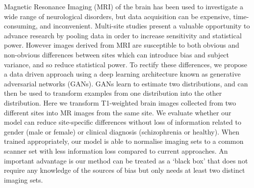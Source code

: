Magnetic Resonance Imaging (MRI) of the brain has been used to investigate a wide range of neurological disorders, but data acquisition can be expensive, time-consuming, and inconvenient. Multi-site studies present a valuable opportunity to advance research by pooling data in order to increase sensitivity and statistical power. However images derived from MRI are susceptible to both obvious and non-obvious differences between sites which can introduce bias and subject variance, and so reduce statistical power. To rectify these differences, we propose a data driven approach using a deep learning architecture known as generative adversarial networks (GANs). GANs learn to estimate two distributions, and can then be used to transform examples from one distribution into the other distribution. Here we transform T1-weighted brain images collected from two different sites into MR images from the same site. We evaluate whether our model can reduce site-specific differences without loss of information related to gender (male or female) or clinical diagnosis (schizophrenia or healthy). When trained appropriately, our model is able to normalise imaging sets to a common scanner set with less information loss compared to current approaches. An important advantage is our method can be treated as a `black box'  that does not require any knowledge of the sources of bias but only needs at least two distinct imaging sets.
